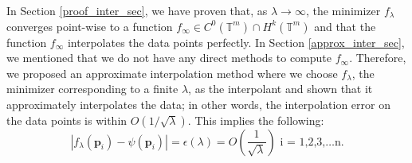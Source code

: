 \documentclass[multixcb]{amstext-l}
\theoremstyle{plain}
\theoremstyle{definition}
\theoremstyle{definition}
\theoremstyle{remark}
\numberwithin{equation}{chapter}
\begin{document}
In Section \ref{proof_inter_sec}, we have proven that, as $\lambda\to\infty$, the minimizer $f_{\lambda}$ converges point-wise to a function $f_{\infty}\in C^0(\mathbb{T}^m)\cap H^k(\mathbb{T}^m)$ and that the function $f_{\infty}$ interpolates the data points perfectly. In Section \ref{approx_inter_sec}, we mentioned that we do not have any direct methods to compute $f_{\infty}$. Therefore, we proposed an approximate interpolation method where we choose $f_{\lambda}$, the minimizer corresponding to a finite $\lambda$, as the interpolant and shown that it approximately interpolates the data; in other words, the interpolation error on the data points is within $O(1/\sqrt{\lambda})$. This implies the following: $$|f_{\lambda}(\boldsymbol{p}_i)-\psi(\boldsymbol{p}_i)| = \epsilon(\lambda) = O(\frac{1}{\sqrt{\lambda}})\mbox{   i = 1,2,3,\ldots n}.$$ 
\end{document}
